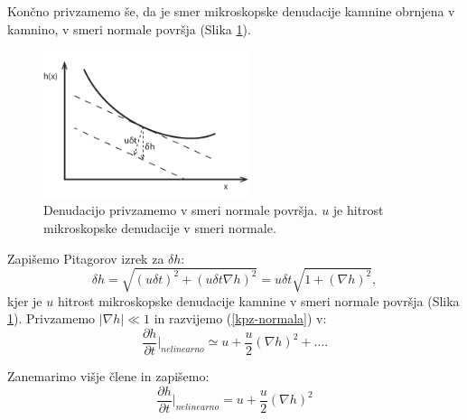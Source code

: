\documentclass[a4paper, twoside, 12pt]{book}
\begin{document}

Končno privzamemo še, da je smer mikroskopske denudacije kamnine obrnjena v kamnino, v smeri normale površja (Slika \ref{fig:KPZ}). 
\begin{figure}[h!]
  \begin{center}
    \includegraphics[width=6cm]{slike/denudacija}
  \end{center}
  \caption{Denudacijo privzamemo v smeri normale površja. $u$ je hitrost mikroskopske denudacije v smeri normale.}
  \label{fig:KPZ}
\end{figure}

Zapišemo Pitagorov izrek za $\delta h$:
\begin{equation}
  \delta h = \sqrt{(u \delta t)^2 + (u \delta t \nabla h)^2} = u \delta t \sqrt{1 + (\nabla h)^2},
  \label{kpz-normala}
\end{equation}
kjer je $u$ hitrost mikroskopske denudacije kamnine v smeri normale površja (Slika \ref{fig:KPZ}). Privzamemo $|\nabla h| \ll 1$ in razvijemo (\ref{kpz-normala}) v:
\begin{equation}
  \frac{\partial h}{\partial t} \bigg|_{nelinearno} \simeq u + \frac{u}{2} (\nabla h)^2 + \dots.
\end{equation}

Zanemarimo višje člene in zapišemo:
\begin{equation}
  \frac{\partial h}{\partial t} \bigg|_{nelinearno} = u + \frac{u}{2} (\nabla h)^2
\end{equation}
\end{document}
